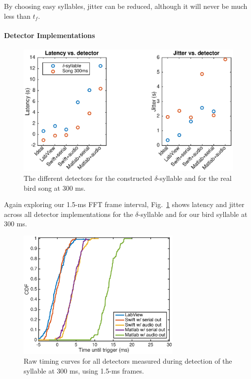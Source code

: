 \documentclass[10pt,letterpaper]{article}
\newcommand\fig[1]{Fig.~\ref{#1}}
\renewcommand{\subsubsection}[1]{\paragraph{#1}}
\begin{document}
By choosing easy syllables, jitter can be reduced, although it will never be much less than $t_f$.

\subsubsection{Detector Implementations}

\begin{figure}
  \includegraphics[width=\textwidth]{TimingVsDetector}
  \caption{The different detectors for the constructed $\delta$-syllable and for the real bird song at 300 ms.}
  \label{fig:TimingVsDetector}
\end{figure}

Again exploring our 1.5-ms FFT frame interval, \fig{fig:TimingVsDetector} shows latency and jitter across all detector implementations for the $\delta$-syllable and for our bird syllable at 300 ms.

\begin{figure}
  \begin{center}
    \includegraphics[width=8cm]{timing}
  \end{center}
  \caption{Raw timing curves for all detectors measured during detection of the syllable at 300 ms, using 1.5-ms frames.}
  \label{fig:timing}
\end{figure}
\end{document}
